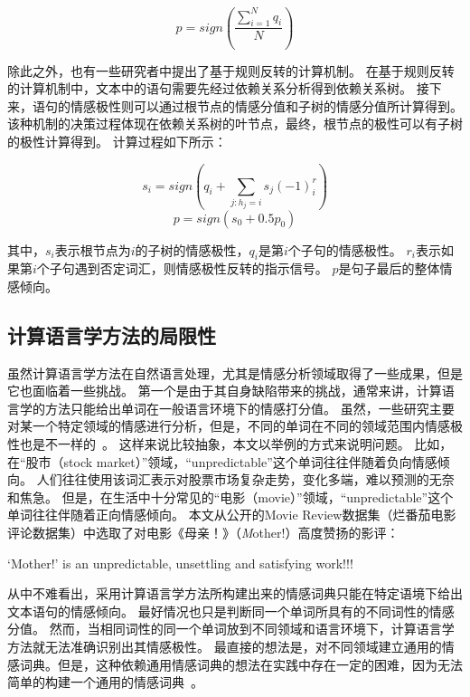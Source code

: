 \begin{equation}
    p = sign\left(\frac{\sum_{i=1}^{N}q_{i}}{N}\right)
    \label{eq:fairscore}
\end{equation}

除此之外，也有一些研究者中提出了基于规则反转的计算机制。
在基于规则反转的计算机制中，文本中的语句需要先经过依赖关系分析得到依赖关系树。
接下来，语句的情感极性则可以通过根节点的情感分值和子树的情感分值所计算得到。
该种机制的决策过程体现在依赖关系树的叶节点，最终，根节点的极性可以有子树的极性计算得到。
计算过程如下所示：

\begin{equation}
    s_{i}=sign\left ( q_{i}+\sum_{j:h_{j}=i}s_{j}\left ( -1 \right )_{i}^{r} \right )
\end{equation}
\begin{equation}
    p=sign\left ( s_{0} +0.5p_{0}\right )
\end{equation}

其中，${s_{i}}$表示根节点为${i}$的子树的情感极性，${q_{i}}$是第${i}$个子句的情感极性。
${r_{i}}$表示如果第${i}$个子句遇到否定词汇，则情感极性反转的指示信号。
${p}$是句子最后的整体情感倾向。

\subsection{计算语言学方法的局限性}
虽然计算语言学方法在自然语言处理，尤其是情感分析领域取得了一些成果，但是它也面临着一些挑战。
第一个是由于其自身缺陷带来的挑战，通常来讲，计算语言学的方法只能给出单词在一般语言环境下的情感打分值。
虽然，一些研究主要对某一个特定领域的情感进行分析，但是，不同的单词在不同的领域范围内情感极性也是不一样的~。
这样来说比较抽象，本文以举例的方式来说明问题。
比如，在“股市（stock market）”领域，“unpredictable”这个单词往往伴随着负向情感倾向。
人们往往使用该词汇表示对股票市场复杂走势，变化多端，难以预测的无奈和焦急。
但是，在生活中十分常见的“电影（movie）”领域，“unpredictable”这个单词往往伴随着正向情感倾向。
本文从公开的Movie Review数据集（烂番茄电影评论数据集）中选取了对电影《母亲！》（\emph Mother!）高度赞扬的影评：

\begin{description}
    \item ‘Mother!’ is an unpredictable, unsettling and satisfying work!!!
\end{description}

从中不难看出，采用计算语言学方法所构建出来的情感词典只能在特定语境下给出文本语句的情感倾向。
最好情况也只是判断同一个单词所具有的不同词性的情感分值。
然而，当相同词性的同一个单词放到不同领域和语言环境下，计算语言学方法就无法准确识别出其情感极性。
最直接的想法是，对不同领域建立通用的情感词典。但是，这种依赖通用情感词典的想法在实践中存在一定的困难，因为无法简单的构建一个通用的情感词典~。

